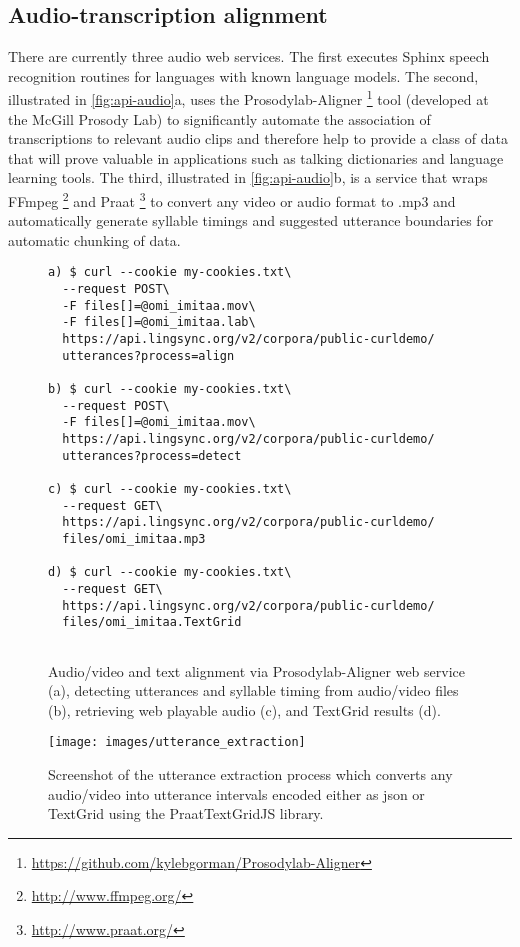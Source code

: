 \documentclass[11pt]{article}
\begin{document}
\subsection{Audio-transcription alignment}
\label{sec:aligner}

There are currently three audio web services. The first executes Sphinx speech
recognition routines for languages with known language models. The second,
illustrated in \autoref{fig:api-audio}a, uses the Prosodylab-Aligner%
\footnote{\url{https://github.com/kylebgorman/Prosodylab-Aligner}} %
tool (developed at the McGill Prosody Lab) to significantly automate the
association of transcriptions to relevant audio clips and therefore help to
provide a class of data that will prove valuable in applications such as
talking dictionaries and language learning tools. The third, illustrated in
\autoref{fig:api-audio}b, is a service that wraps FFmpeg%
\footnote{\url{http://www.ffmpeg.org/}} %
and Praat%
\footnote{\url{http://www.praat.org/}} %
to convert any video or audio format to .mp3 and automatically generate
syllable timings and suggested utterance boundaries \cite{DeJong:2009} for
automatic chunking of data.


\begin{figure}[h]
\scriptsize
\begin{verbatim}
a) $ curl --cookie my-cookies.txt\
  --request POST\
  -F files[]=@omi_imitaa.mov\
  -F files[]=@omi_imitaa.lab\
  https://api.lingsync.org/v2/corpora/public-curldemo/
  utterances?process=align

b) $ curl --cookie my-cookies.txt\
  --request POST\
  -F files[]=@omi_imitaa.mov\
  https://api.lingsync.org/v2/corpora/public-curldemo/
  utterances?process=detect
  
c) $ curl --cookie my-cookies.txt\
  --request GET\
  https://api.lingsync.org/v2/corpora/public-curldemo/
  files/omi_imitaa.mp3
 
d) $ curl --cookie my-cookies.txt\
  --request GET\
  https://api.lingsync.org/v2/corpora/public-curldemo/
  files/omi_imitaa.TextGrid
   
\end{verbatim}
\caption{Audio/video and text alignment via Prosodylab-Aligner web service (a),
detecting utterances and syllable timing from audio/video files (b), retrieving
web playable audio (c), and TextGrid results (d).}
\normalsize
\label{fig:api-audio}
\end{figure}


\begin{figure}
\begin{center}
\texttt{[image: images/utterance\_extraction]}
\caption{Screenshot of the utterance extraction process which converts any
audio/video into utterance intervals encoded either as \gls{json} or TextGrid using
the PraatTextGridJS library.}
\label{utterance_extraction_screenshot}
\end{center}
\end{figure}
\end{document}
